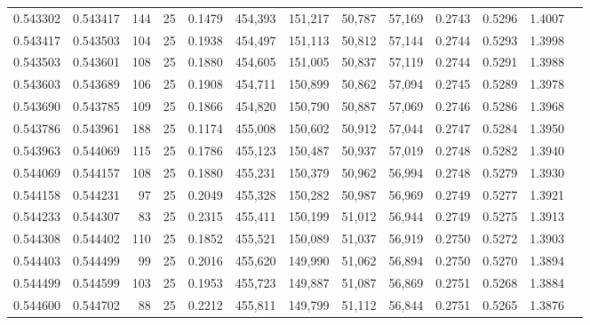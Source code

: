 \begin{tabular}{rrrrrrrrrrrrr}
0.543302 & 0.543417 &   144 &  25 &                                     0.1479 & 454,393 & 151,217 &  50,787 &  57,169 & 0.2743 & 0.5296 & 1.4007 \\
0.543417 & 0.543503 &   104 &  25 &                                     0.1938 & 454,497 & 151,113 &  50,812 &  57,144 & 0.2744 & 0.5293 & 1.3998 \\
0.543503 & 0.543601 &   108 &  25 &                                     0.1880 & 454,605 & 151,005 &  50,837 &  57,119 & 0.2744 & 0.5291 & 1.3988 \\
0.543603 & 0.543689 &   106 &  25 &                                     0.1908 & 454,711 & 150,899 &  50,862 &  57,094 & 0.2745 & 0.5289 & 1.3978 \\
0.543690 & 0.543785 &   109 &  25 &                                     0.1866 & 454,820 & 150,790 &  50,887 &  57,069 & 0.2746 & 0.5286 & 1.3968 \\
0.543786 & 0.543961 &   188 &  25 &                                     0.1174 & 455,008 & 150,602 &  50,912 &  57,044 & 0.2747 & 0.5284 & 1.3950 \\
0.543963 & 0.544069 &   115 &  25 &                                     0.1786 & 455,123 & 150,487 &  50,937 &  57,019 & 0.2748 & 0.5282 & 1.3940 \\
0.544069 & 0.544157 &   108 &  25 &                                     0.1880 & 455,231 & 150,379 &  50,962 &  56,994 & 0.2748 & 0.5279 & 1.3930 \\
0.544158 & 0.544231 &    97 &  25 &                                     0.2049 & 455,328 & 150,282 &  50,987 &  56,969 & 0.2749 & 0.5277 & 1.3921 \\
0.544233 & 0.544307 &    83 &  25 &                                     0.2315 & 455,411 & 150,199 &  51,012 &  56,944 & 0.2749 & 0.5275 & 1.3913 \\
0.544308 & 0.544402 &   110 &  25 &                                     0.1852 & 455,521 & 150,089 &  51,037 &  56,919 & 0.2750 & 0.5272 & 1.3903 \\
0.544403 & 0.544499 &    99 &  25 &                                     0.2016 & 455,620 & 149,990 &  51,062 &  56,894 & 0.2750 & 0.5270 & 1.3894 \\
0.544499 & 0.544599 &   103 &  25 &                                     0.1953 & 455,723 & 149,887 &  51,087 &  56,869 & 0.2751 & 0.5268 & 1.3884 \\
0.544600 & 0.544702 &    88 &  25 &                                     0.2212 & 455,811 & 149,799 &  51,112 &  56,844 & 0.2751 & 0.5265 & 1.3876 \\

\end{tabular}
